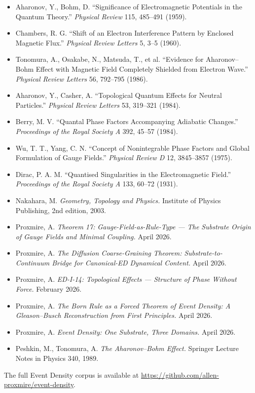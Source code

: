 \documentclass[11pt,a4paper]{article}
\begin{document}
\begin{itemize}[leftmargin=*,itemsep=2pt]
  \item Aharonov, Y., Bohm, D. ``Significance of Electromagnetic Potentials in the Quantum Theory.'' \emph{Physical Review} 115, 485--491 (1959).
  \item Chambers, R. G. ``Shift of an Electron Interference Pattern by Enclosed Magnetic Flux.'' \emph{Physical Review Letters} 5, 3--5 (1960).
  \item Tonomura, A., Osakabe, N., Matsuda, T., et al. ``Evidence for Aharonov--Bohm Effect with Magnetic Field Completely Shielded from Electron Wave.'' \emph{Physical Review Letters} 56, 792--795 (1986).
  \item Aharonov, Y., Casher, A. ``Topological Quantum Effects for Neutral Particles.'' \emph{Physical Review Letters} 53, 319--321 (1984).
  \item Berry, M. V. ``Quantal Phase Factors Accompanying Adiabatic Changes.'' \emph{Proceedings of the Royal Society A} 392, 45--57 (1984).
  \item Wu, T. T., Yang, C. N. ``Concept of Nonintegrable Phase Factors and Global Formulation of Gauge Fields.'' \emph{Physical Review D} 12, 3845--3857 (1975).
  \item Dirac, P. A. M. ``Quantised Singularities in the Electromagnetic Field.'' \emph{Proceedings of the Royal Society A} 133, 60--72 (1931).
  \item Nakahara, M. \emph{Geometry, Topology and Physics.} Institute of Physics Publishing, 2nd edition, 2003.
  \item Proxmire, A. \emph{Theorem 17: Gauge-Field-as-Rule-Type --- The Substrate Origin of Gauge Fields and Minimal Coupling.} April 2026.
  \item Proxmire, A. \emph{The Diffusion Coarse-Graining Theorem: Substrate-to-Continuum Bridge for Canonical-ED Dynamical Content.} April 2026.
  \item Proxmire, A. \emph{ED-I-14: Topological Effects --- Structure of Phase Without Force.} February 2026.
  \item Proxmire, A. \emph{The Born Rule as a Forced Theorem of Event Density: A Gleason--Busch Reconstruction from First Principles.} April 2026.
  \item Proxmire, A. \emph{Event Density: One Substrate, Three Domains.} April 2026.
  \item Peshkin, M., Tonomura, A. \emph{The Aharonov--Bohm Effect.} Springer Lecture Notes in Physics 340, 1989.
\end{itemize}

The full Event Density corpus is available at \url{https://github.com/allen-proxmire/event-density}.
\end{document}
